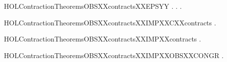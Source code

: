 \newcommand{\HOLContractionTheoremsOBSXXcontractsXXBYXXCONTRACTION}{\UseVerbatim{HOLContractionTheoremsOBSXXcontractsXXBYXXCONTRACTION}}
\begin{SaveVerbatim}{HOLContractionTheoremsOBSXXcontractsXXEPSYY}
\HOLTokenTurnstile{} \HOLSymConst{\HOLTokenForall{}} .
          \HOLSymConst{\HOLTokenImp{}}
       \HOLSymConst{\HOLTokenForall{}}.    \HOLSymConst{\HOLTokenImp{}} \HOLSymConst{\HOLTokenExists{}}.    \HOLSymConst{\HOLTokenConj{}}   
\end{SaveVerbatim}
\newcommand{\HOLContractionTheoremsOBSXXcontractsXXEPSYY}{\UseVerbatim{HOLContractionTheoremsOBSXXcontractsXXEPSYY}}
\begin{SaveVerbatim}{HOLContractionTheoremsOBSXXcontractsXXIMPXXCXXcontracts}
\HOLTokenTurnstile{} \HOLSymConst{\HOLTokenForall{}} .    \HOLSymConst{\HOLTokenImp{}}   
\end{SaveVerbatim}
\newcommand{\HOLContractionTheoremsOBSXXcontractsXXIMPXXCXXcontracts}{\UseVerbatim{HOLContractionTheoremsOBSXXcontractsXXIMPXXCXXcontracts}}
\begin{SaveVerbatim}{HOLContractionTheoremsOBSXXcontractsXXIMPXXcontracts}
\HOLTokenTurnstile{} \HOLSymConst{\HOLTokenForall{}} .    \HOLSymConst{\HOLTokenImp{}}   
\end{SaveVerbatim}
\newcommand{\HOLContractionTheoremsOBSXXcontractsXXIMPXXcontracts}{\UseVerbatim{HOLContractionTheoremsOBSXXcontractsXXIMPXXcontracts}}
\begin{SaveVerbatim}{HOLContractionTheoremsOBSXXcontractsXXIMPXXOBSXXCONGR}
\HOLTokenTurnstile{} \HOLSymConst{\HOLTokenForall{}} .    \HOLSymConst{\HOLTokenImp{}}   
\end{SaveVerbatim}
\newcommand{\HOLContractionTheoremsOBSXXcontractsXXIMPXXOBSXXCONGR}{\UseVerbatim{HOLContractionTheoremsOBSXXcontractsXXIMPXXOBSXXCONGR}}
